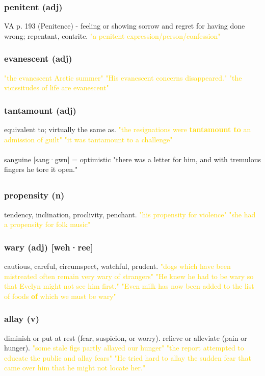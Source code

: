 \documentclass{proc}
\begin{document}
	\subsubsection{\textcolor{brickred}{penitent} (adj)}
	VA p. 193 (Penitence) - feeling or showing sorrow and regret for having done wrong; repentant, contrite.
	\textcolor{gold}{"a penitent expression/person/confession"}
	
	\subsubsection{\textcolor{brickred}{evanescent} (adj)}
	\textcolor{gold}{"the evanescent Arctic summer" "His evanescent concerns disappeared." "the vicissitudes of life are evanescent"}
	
	\subsubsection{\textcolor{brickred}{tantamount} (adj)}
	equivalent to; virtually the same as.
	\textcolor{gold}{"the resignations were \textbf{tantamount to} an admission of guilt" "it was tantamount to a challenge"}\\\\
	sanguine [sang·gwn] = optimistic
	"there was a letter for him, and with tremulous fingers he tore it open."
	
	\newpage
	\subsection{}
	\subsubsection{\textcolor{brickred}{propensity} (n)}
	tendency,
	inclination, proclivity, penchant.
	\textcolor{gold}{"his propensity for violence" "she had a propensity for folk music"}
	
	\subsubsection{\textcolor{brickred}{wary} (adj) [weh·ree]}
	cautious,
	careful,
	circumspect,
	watchful, prudent.
	\textcolor{gold}{"dogs which have been mistreated often remain very wary of strangers" "He knew he had to be wary so that Evelyn might not see him first." "Even milk has now been added to the list of foods \textbf{of} which we must be wary"}
	
	\subsubsection{\textcolor{brickred}{allay} (v)}
	diminish or put at rest (fear, suspicion, or worry). relieve or alleviate (pain or hunger).
	\textcolor{gold}{"some stale figs partly allayed our hunger" "the report attempted to educate the public and allay fears" "He tried hard to allay the sudden fear that came over him that he might not locate her."}
	
\end{document}
